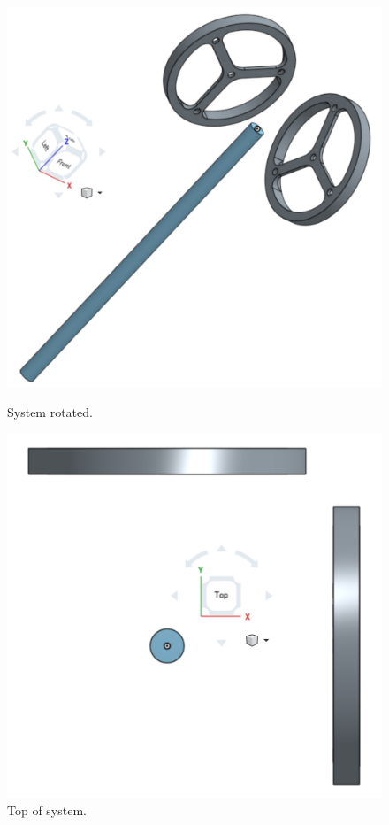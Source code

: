\documentclass{article}
\begin{document}
\begin{figure}[h]
\centering
\begin{minipage}{.5\textwidth}
 \centering
 \includegraphics[width=1\linewidth]{system_angle}
 \caption{System rotated.}
\end{minipage}%
\begin{minipage}{.5\textwidth}
 \centering
 \includegraphics[width=1\linewidth]{system_top}
 \caption{Top of system.}
\end{minipage}
\end{figure}
\end{document}
